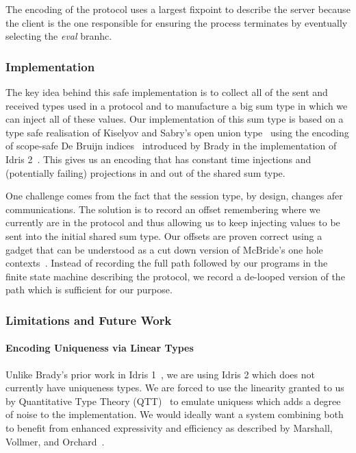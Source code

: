 \documentclass{easychair}
\begin{document}
The encoding of the protocol uses a largest fixpoint to
describe the server because the client is the one responsible
for ensuring the process terminates by eventually selecting
the \emph{eval} branhc.

\subsubsection*{Implementation}

The key idea behind this safe implementation is to collect all of the sent
and received types used in a protocol and to manufacture a big sum type
in which we can inject all of these values.
%
Our implementation of this sum type is based on a type safe realisation of
Kiselyov and Sabry's open union type~\cite{DBLP:conf/haskell/KiselyovSS13}
using the encoding of scope-safe
De Bruijn indices~\cite{MANUAL:journals/math/debruijn72}
introduced by Brady in the implementation of
Idris 2~\cite{DBLP:conf/ecoop/Brady21}.
%
This gives us an encoding that has constant time injections and
(potentially failing) projections in and out of the shared sum type.


One challenge comes from the fact that the session type, by design,
changes afer communications.
%
The solution is to record an offset remembering where we currently
are in the protocol and thus allowing us to keep injecting values to
be sent into the initial shared sum type.
%
Our offsets are proven correct using a gadget that can be understood
as a cut down version of McBride's one hole
contexts~\cite{DBLP:conf/popl/McBride08}. Instead
of recording the full path followed by our programs in the finite
state machine describing the protocol, we record a de-looped version
of the path which is sufficient for our purpose.


\subsubsection*{Limitations and Future Work}

\paragraph{Encoding Uniqueness via Linear Types}
Unlike Brady's prior work in Idris 1~\cite{DBLP:journals/aghcs/Brady17},
we are using Idris 2 which does not currently have uniqueness types.
We are forced to use the linearity granted to us by
Quantitative Type Theory (QTT)~\cite{DBLP:conf/birthday/McBride16,DBLP:conf/lics/Atkey18}
to emulate uniquess which adds a degree of noise to the implementation.
We would ideally want a system combining both to benefit from enhanced
expressivity and efficiency as described by Marshall, Vollmer,
and Orchard~\cite{DBLP:conf/esop/MarshallVO22}.
\end{document}
